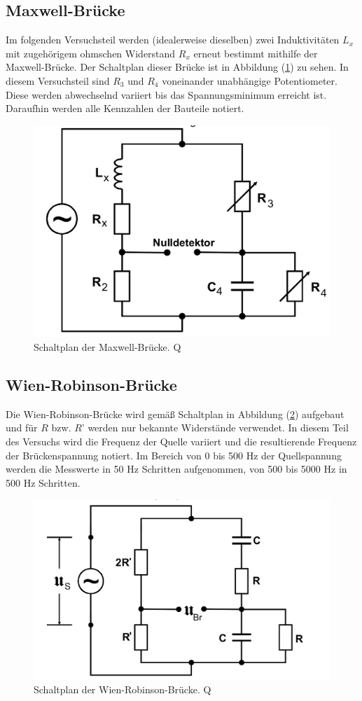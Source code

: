 \subsection{Maxwell-Brücke}
Im folgenden Versuchsteil werden (idealerweise dieselben) zwei Induktivitäten $L_x$ mit zugehörigem ohmschen Widerstand $R_x$ erneut bestimmt mithilfe der 
Maxwell-Brücke. Der Schaltplan dieser Brücke ist in Abbildung (\ref{pic:Maxwell-Bruecke}) zu sehen. In diesem Versuchsteil sind $R_3$ und $R_4$ voneinander unabhängige
Potentiometer. Diese werden abwechselnd variiert bis das Spannungsminimum erreicht ist. Daraufhin werden alle Kennzahlen der Bauteile notiert. 
\begin{figure}[H]
    \centering
    \includegraphics[width=0.4\linewidth]{Maxwell_Bruecke.png}
    \caption{Schaltplan der Maxwell-Brücke. Q\cite{anleitungV302}}
    \label{pic:Maxwell-Bruecke}
\end{figure} 
\subsection{Wien-Robinson-Brücke}
Die Wien-Robinson-Brücke wird gemäß Schaltplan in Abbildung (\ref{pic:WRB}) aufgebaut und für $R$ bzw. $R$' werden nur bekannte Widerstände verwendet. 
In diesem Teil des Versuchs wird die Frequenz der Quelle variiert und die resultierende Frequenz der Brückenspannung notiert. Im Bereich von 0 bis 500 Hz der Quellspannung 
werden die Messwerte in 50 Hz Schritten aufgenommen, von 500 bis 5000 Hz in 500 Hz Schritten. 
\begin{figure}[H]
    \centering
    \includegraphics[width=0.4\linewidth]{Wienrobinson_Bruecke.png}
    \caption{Schaltplan der Wien-Robinson-Brücke. Q\cite{anleitungV302}}
    \label{pic:WRB}
\end{figure} 
